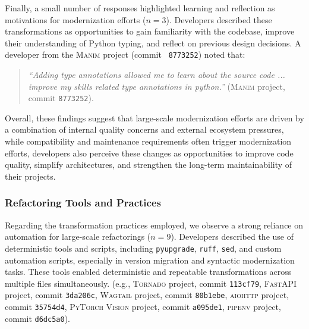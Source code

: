 Finally, a small number of responses highlighted learning and reflection as motivations for modernization efforts ($n = 3$). Developers described these transformations as opportunities to gain familiarity with the codebase, improve their understanding of Python typing, and reflect on previous design decisions. 
A developer from the \textsc{Manim} project (commit ~\texttt{8773252}) noted that:
\begin{quote}
\textit{``Adding type annotations allowed me to learn about the source code ... improve my skills related type annotations in python.''} (\textsc{Manim} project, commit \texttt{8773252}).
\end{quote}



Overall, these findings suggest that large-scale modernization efforts are driven by a combination of internal quality concerns and external ecosystem pressures, while compatibility and maintenance requirements often trigger modernization efforts, developers also perceive these changes as opportunities to improve code quality, simplify architectures, and strengthen the long-term maintainability of their projects.


\subsubsection{Refactoring Tools and Practices}

Regarding the transformation practices employed, we observe a strong reliance on automation for large-scale refactorings ($n = 9$). Developers described the use of deterministic tools and scripts, including \texttt{pyupgrade}, \texttt{ruff}, \texttt{sed}, and custom automation scripts, especially in version migration and syntactic modernization tasks. These tools enabled deterministic and repeatable transformations across multiple files simultaneously. (e.g., \textsc{Tornado} project, commit \texttt{113cf79}, \textsc{FastAPI} project, commit \texttt{3da206c}, \textsc{Wagtail} project, commit \texttt{80b1ebe}, \textsc{aiohttp} project, commit \texttt{35754d4}, \textsc{PyTorch Vision} project, commit \texttt{a095de1}, \textsc{pipenv} project, commit \texttt{d6dc5a0}).

